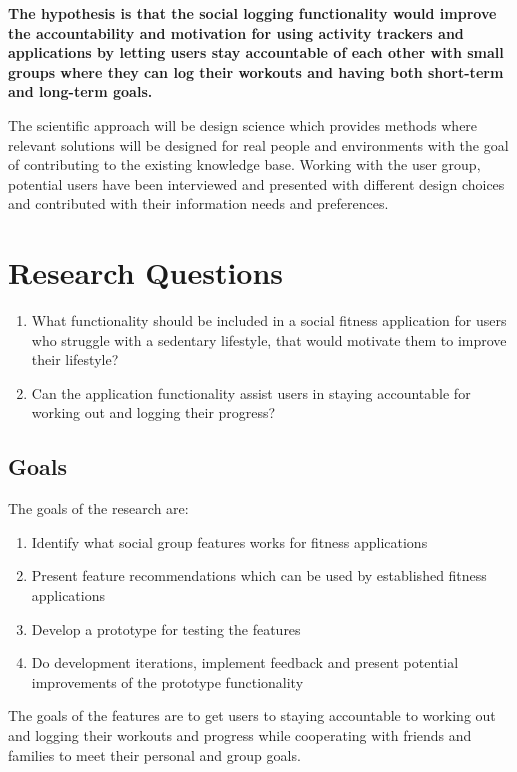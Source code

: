 \textbf{The hypothesis is that the social logging functionality would improve the accountability and motivation for using activity trackers and applications by letting users stay accountable of each other with small groups where they can log their workouts and having both short-term and long-term goals.}

The scientific approach will be design science which provides methods where relevant solutions will be designed for real people and environments with the goal of contributing to the existing knowledge base. Working with the user group, potential users have been interviewed and presented with different design choices and contributed with their information needs and preferences. 


\section{Research Questions} \label{RQs}
\begin{enumerate}
    \item What functionality should be included in a social fitness application for users who struggle with a sedentary lifestyle, that would motivate them to improve their lifestyle? 

    \item Can the application functionality assist users in staying accountable for working out and logging their progress?
\end{enumerate}
\subsection{Goals}
The goals of the research are:
\begin{enumerate}
\item Identify what social group features works for fitness applications
\item Present feature recommendations which can be used by established fitness applications
\item Develop a prototype for testing the features
\item Do development iterations, implement feedback
 and present potential improvements of the prototype functionality 
\end{enumerate}
The goals of the features are to get users to staying accountable to working out and logging their workouts and progress while cooperating with friends and families to meet their personal and group goals.
 
\newpage
 
